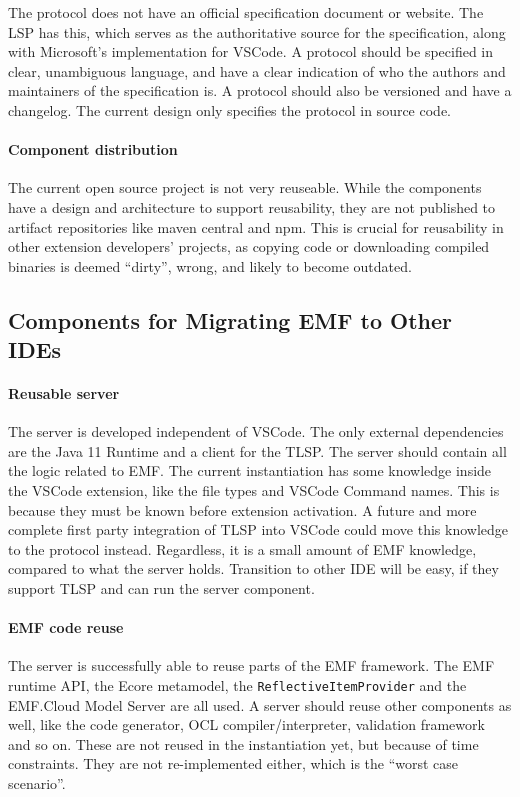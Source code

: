 The protocol does not have an official specification document or website.
The \acrshort{LSP} has this, which serves as the authoritative source for the specification, along with Microsoft's implementation for \gls{VSCode}.
A protocol should be specified in clear, unambiguous language, and have a clear indication of who the authors and maintainers of the specification is.
A protocol should also be versioned and have a changelog.
The current design only specifies the protocol in source code.

\paragraph{Component distribution}
The current open source project is not very reuseable.
While the components have a design and architecture to support reusability, they are not published to artifact repositories like maven central and npm.
This is crucial for reusability in other extension developers' projects, as copying code or downloading compiled binaries is deemed ``dirty'', wrong, and likely to become outdated.

\subsection{Components for Migrating EMF to Other IDEs}

\paragraph{Reusable server}
The server is developed independent of \gls{VSCode}.
The only external dependencies are the Java 11 Runtime and a client for the \acrlong{TLSP}.
The server should contain all the logic related to \acrshort{EMF}.
The current instantiation has some knowledge inside the \gls{VSCode} extension, like the file types and \gls{VSCode} Command names.
This is because they must be known before extension activation.
A future and more complete first party integration of \acrshort{TLSP} into \acrshort{VSCode} could move this knowledge to the protocol instead.
Regardless, it is a small amount of \acrshort{EMF} knowledge, compared to what the server holds.
Transition to other \acrshort{IDE} will be easy, if they support \acrshort{TLSP} and can run the server component.

\paragraph{EMF code reuse}
The server is successfully able to reuse parts of the \acrshort{EMF} framework.
The \acrshort{EMF} runtime \acrshort{API}, the \gls{Ecore} metamodel, the \texttt{ReflectiveItemProvider} and the EMF.Cloud Model Server are all used.
A server should reuse other components as well, like the code generator, \gls{OCL} compiler/interpreter, validation framework and so on.
These are not reused in the instantiation yet, but because of time constraints.
They are not re-implemented either, which is the ``worst case scenario''.\\
